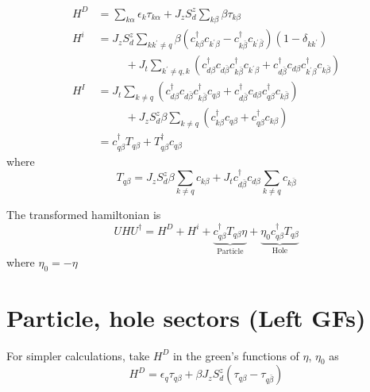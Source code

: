 \documentclass[14pt]{extarticle}
\numberwithin{equation}{section}
\begin{document}
\begin{align}
  H^D &= \sum\limits_{k \alpha} \epsilon_k \tau_{k\alpha}  +J_z S_d^z \sum\limits_{k\beta} \beta \tau_{k\beta} \label{eq:a33} \\
  H^i &= J_z S_d^z \sum\limits_{kk^{\prime} \ne q} \beta \left( c^{\dag}_{k\beta} c_{k^{\prime}\beta} - c^{\dag}_{k\bar{\beta}} c_{k^{\prime}\bar{\beta}} \right) \left( 1 - \delta_{kk^{\prime}} \right) \nonumber\\
& \hspace{30pt} + J_t \sum\limits_{k^{\prime}\ne q, k} \left( c^{\dag}_{d\beta} c_{d\bar{\beta}} c^{\dag}_{k\bar{\beta}} c_{k^{\prime} \beta} + c^{\dag}_{d\bar{\beta}} c_{d\beta} c^{\dag}_{k^{\prime} \beta} c_{k\bar{\beta}}  \right)\label{eq:a34} \\
  H^I &= J_t \sum\limits_{k \ne q} \left( c^{\dag}_{d\beta} c_{d\bar{\beta}} c^{\dag}_{k\bar{\beta}} c_{q\beta} + c^{\dag}_{d\bar{\beta}} c_{d\beta} c^{\dag}_{q\beta} c_{k\bar{\beta}}  \right) \nonumber\\
&\hspace{30pt} + J_zS_d^z\beta \sum\limits_{k \ne q} \left( c^{\dag}_{k\beta} c_{q\beta} + c_{q\beta}^{\dag} c_{k\beta} \right)  \label{eq:a35} \\
  &= c^{\dag}_{q\beta}T_{q\beta} + T_{q\beta}^{\dag}c_{q\beta} \nonumber
\end{align}
where
\begin{equation}
T_{q\beta} =  J_zS_d^z \beta \sum\limits_{k \neq q} c_{k\beta} + J_t c^{\dag}_{d\bar{\beta}} c_{d\beta} \sum\limits_{k \neq q} c_{k\bar{\beta}} \label{eq:a36} 
\end{equation}

The transformed hamiltonian is
\begin{equation}
 UHU^{\dag} = H^D + H^i + \underbrace{c^{\dag}_{q\beta}T_{q\beta}\eta}_{\text{Particle}} + \underbrace{\eta_0 c^{\dag}_{q\beta}T_{q\beta}}_{\text{Hole}}  \label{eq:1} 
\end{equation}
where $\eta_0 = -\eta$ 

\section{Particle, hole sectors (Left GFs)}
For simpler calculations, take $H^D$ in the green's functions of $\eta$, $\eta_0$ as
\begin{equation}
 H^D = \epsilon_q\tau_{q\beta} + \beta J_zS^z_d \left( \tau_{q\beta} - \tau_{q\bar{\beta}} \right)  \label{eq:20} 
\end{equation}
\end{document}
